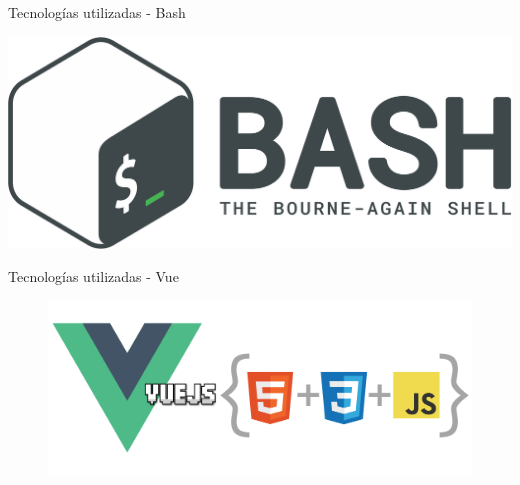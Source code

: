 \documentclass{beamer}
\begin{document}
        \begin{frame}{Tecnologías utilizadas - Bash}
        
    		\begin{center}
                \includegraphics[width=1\textwidth]{Presentacion/tecnologias/home.png}\hfill
    		\end{center}  
            
        \end{frame}

        \begin{frame}{Tecnologías utilizadas - Vue}
        
    		\begin{figure}[htp]
                \centering
                \includegraphics[width=1\textwidth]{Presentacion/tecnologias/vuejs.png}\hfill
                \label{fig:vuejs}
    		\end{figure}  
            
        \end{frame}
\end{document}
